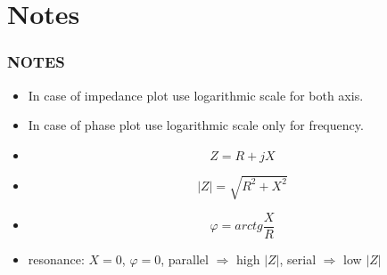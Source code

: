 \documentclass{beamer}
\begin{document}
\section{\texorpdfstring{Notes}{Notes}}
\begin{frame}
    \frametitle{NOTES}
		\small
	\begin{itemize}
		\item In case of impedance plot use logarithmic scale for both axis.
		\item In case of phase plot use logarithmic scale only for frequency.
		\item $$\hat{Z} = R + jX$$
		\item $$\left|Z\right|= \sqrt{R^2 + X^2}$$
		\item $$\varphi = arctg \frac{X}{R}$$
		\item resonance: $X = 0$, $\varphi = 0$, parallel $\Rightarrow$ high $\left|Z\right|$, serial $\Rightarrow$ low $\left|Z\right|$
	\end{itemize}
	\end{frame}

\end{document}

